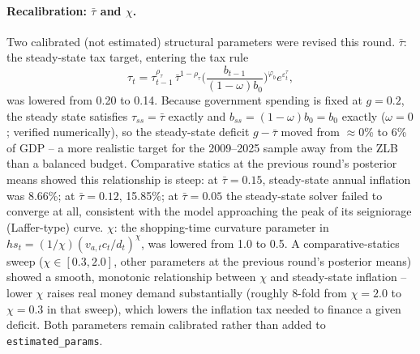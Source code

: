 \documentclass[11pt]{article}
\begin{document}
\paragraph{Recalibration: $\bar\tau$ and $\chi$.} Two calibrated (not
estimated) structural parameters were revised this round.
\emph{$\bar\tau$}: the steady-state tax target, entering the tax rule
\[
\tau_t = \tau_{t-1}^{\rho_\tau}\,\bar\tau^{1-\rho_\tau}
\Big(\frac{b_{t-1}}{(1-\omega)b_0}\Big)^{\varphi_b} e^{\varepsilon^\tau_t},
\]
was lowered from 0.20 to 0.14. Because government spending is fixed at
$g=0.2$, the steady state satisfies $\tau_{ss}=\bar\tau$ exactly and
$b_{ss}=(1-\omega)b_0=b_0$ exactly ($\omega=0$; verified numerically), so the steady-state deficit
$g-\bar\tau$ moved from $\approx$0\% to 6\% of GDP -- a more realistic
target for the 2009--2025 sample away from the ZLB than a balanced
budget. Comparative statics at the previous round's posterior means
showed this relationship is steep: at $\bar\tau=0.15$, steady-state
annual inflation was 8.66\%; at $\bar\tau=0.12$, 15.85\%; at
$\bar\tau=0.05$ the steady-state solver failed to converge at all,
consistent with the model approaching the peak of its seigniorage
(Laffer-type) curve. \emph{$\chi$}: the shopping-time curvature
parameter in $hs_t=(1/\chi)(v_{a,t}c_t/d_t)^\chi$, was lowered from 1.0
to 0.5. A comparative-statics sweep ($\chi\in[0.3,2.0]$, other
parameters at the previous round's posterior means) showed a smooth,
monotonic relationship between $\chi$ and steady-state inflation --
lower $\chi$ raises real money demand substantially (roughly 8-fold
from $\chi=2.0$ to $\chi=0.3$ in that sweep), which lowers the inflation
tax needed to finance a given deficit. Both parameters remain calibrated
rather than added to \texttt{estimated\_params}.
\end{document}
